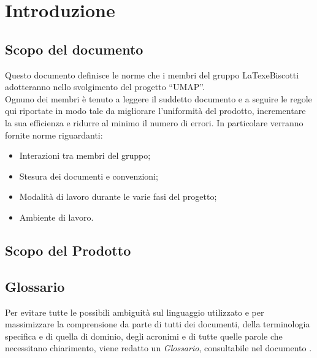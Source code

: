 \section{Introduzione}

\subsection{Scopo del documento}

Questo documento definisce le norme che i membri del gruppo LaTexeBiscotti adotteranno nello svolgimento del progetto “UMAP”. \\

Ognuno dei membri è tenuto a leggere il suddetto documento e a seguire le regole qui riportate in modo tale da migliorare l'uniformità del prodotto, incrementare la sua efficienza e ridurre al minimo il numero di errori. In particolare verranno fornite norme riguardanti:
\begin{itemize}
\item Interazioni tra membri del gruppo;
\item Stesura dei documenti e convenzioni;
\item Modalità di lavoro durante le varie fasi del progetto;
\item Ambiente di lavoro.
\end{itemize}

\subsection{Scopo del Prodotto}
\ScopoDelProdotto

\subsection{Glossario}
Per evitare tutte le possibili ambiguità sul linguaggio utilizzato e per massimizzare la comprensione da parte di tutti dei documenti, della terminologia specifica e di quella di dominio, degli acronimi e di tutte quelle parole che necessitano chiarimento, viene redatto un \textit{Glossario}, consultabile nel documento \Glossario.






